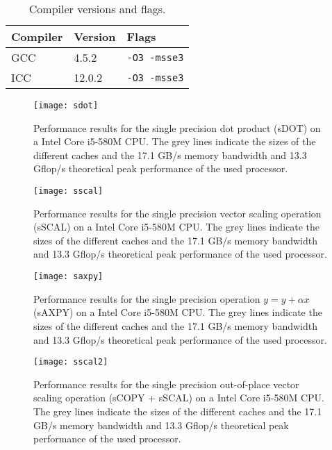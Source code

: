 \documentclass[12pt]{article}
\begin{document}
\begin{table}[h]
\begin{center}
\begin{tabular}{| l | l | l | }
  \hline                       
  Compiler & Version & Flags \\
  \hline                       
  GCC & 4.5.2 & \texttt{-O3 -msse3} \\
  ICC & 12.0.2 & \texttt{-O3 -msse3} \\
  \hline  
\end{tabular}
\end{center}
\caption{Compiler versions and flags.}
\label{cflags}
\end{table}

\begin{figure}
\texttt{[image: sdot]}
\caption{Performance results for the single precision dot product (sDOT) on a Intel Core i5-580M CPU.
The grey lines indicate the sizes of the different caches and the 17.1 GB/s memory bandwidth and
13.3 Gflop/s theoretical peak performance of the used processor.}

\label{i5sdot}
\end{figure}
\begin{figure}
\texttt{[image: sscal]}
\caption{Performance results for the single precision vector scaling operation (sSCAL) on a Intel Core i5-580M CPU.
The grey lines indicate the sizes of the different caches and the 17.1 GB/s memory bandwidth and
13.3 Gflop/s theoretical peak performance of the used processor.}
\label{i5sscal}
\end{figure}
\begin{figure}
\texttt{[image: saxpy]}
\caption{Performance results for the single precision operation $y = y + \alpha x$ (sAXPY) on a Intel Core i5-580M CPU.
The grey lines indicate the sizes of the different caches and the 17.1 GB/s memory bandwidth and
13.3 Gflop/s theoretical peak performance of the used processor.}
\label{i5saxpy}
\end{figure}
\begin{figure}
\texttt{[image: sscal2]}
\caption{Performance results for the single precision out-of-place vector scaling operation (sCOPY + sSCAL) on a Intel Core i5-580M CPU.
The grey lines indicate the sizes of the different caches and the 17.1 GB/s memory bandwidth and
13.3 Gflop/s theoretical peak performance of the used processor.}
\label{i5sscal2}
\end{figure}
\end{document}
